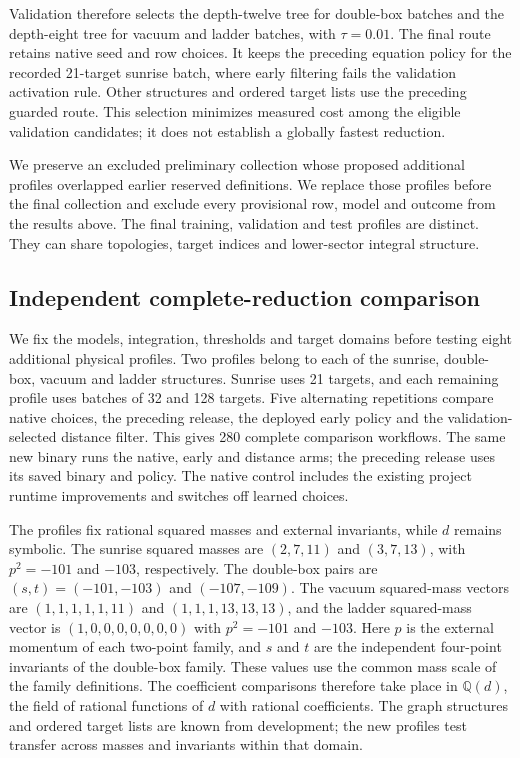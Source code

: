 Validation therefore selects the depth-twelve tree for double-box batches
and the depth-eight tree for vacuum and ladder batches, with $\tau=0.01$.
The final route retains native seed and row choices. It keeps the preceding
equation policy for the recorded 21-target sunrise batch, where early
filtering fails the validation activation rule. Other structures and
ordered target lists use the preceding guarded route. This selection
minimizes measured cost among the eligible validation candidates; it does
not establish a globally fastest reduction.

We preserve an excluded preliminary collection whose proposed additional
profiles overlapped earlier reserved definitions. We replace those profiles
before the final collection and exclude every provisional row, model and
outcome from the results above. The final training, validation and test
profiles are distinct. They can share topologies, target indices and
lower-sector integral structure.

\subsection{Independent complete-reduction comparison}
We fix the models, integration, thresholds and target domains before testing
eight additional physical profiles. Two profiles belong to each of the
sunrise, double-box, vacuum and ladder structures. Sunrise uses 21 targets,
and each remaining profile uses batches of 32 and 128 targets.
Five alternating repetitions compare native choices, the preceding release,
the deployed early policy and the validation-selected distance filter.
This gives 280 complete comparison workflows. The same new binary runs
the native, early and distance arms; the preceding release uses its saved
binary and policy. The native control includes the existing project
runtime improvements and switches off learned choices.

The profiles fix rational squared masses and external invariants, while
$d$ remains symbolic. The sunrise squared masses are $(2,7,11)$ and
$(3,7,13)$, with $p^2=-101$ and $-103$, respectively.
The double-box pairs are $(s,t)=(-101,-103)$ and $(-107,-109)$.
The vacuum squared-mass vectors are $(1,1,1,1,1,11)$ and
$(1,1,1,13,13,13)$, and the ladder squared-mass vector is
$(1,0,0,0,0,0,0,0)$ with $p^2=-101$ and $-103$.
Here $p$ is the external momentum of each two-point family, and $s$ and $t$
are the independent four-point invariants of the double-box family.
These values use the common mass scale of the family definitions.
The coefficient comparisons therefore take place in $\mathbb Q(d)$,
the field of rational functions of $d$ with rational coefficients.
The graph structures and ordered target lists are known from development;
the new profiles test transfer across masses and invariants within that domain.

